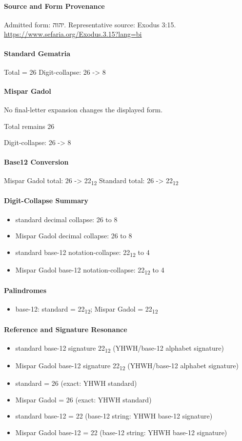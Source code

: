 \paragraph{Source and Form Provenance}
Admitted form: יהוה.
Representative source: Exodus 3:15.
\url{https://www.sefaria.org/Exodus.3.15?lang=bi}
\paragraph{Standard Gematria}
Total = 26
Digit-collapse: 26 -> 8
\paragraph{Mispar Gadol}
No final-letter expansion changes the displayed form.

Total remains 26

Digit-collapse: 26 -> 8
\paragraph{Base12 Conversion}
Mispar Gadol total: 26 -> 22\textsubscript{12}
Standard total: 26 -> 22\textsubscript{12}
\paragraph{Digit-Collapse Summary}
\begin{itemize}
\item standard decimal collapse: 26 to 8
\item Mispar Gadol decimal collapse: 26 to 8
\item standard base-12 notation-collapse: 22\textsubscript{12} to 4
\item Mispar Gadol base-12 notation-collapse: 22\textsubscript{12} to 4
\end{itemize}
\paragraph{Palindromes}
\begin{itemize}
\item base-12: standard = 22\textsubscript{12}; Mispar Gadol = 22\textsubscript{12}
\end{itemize}
\paragraph{Reference and Signature Resonance}
\begin{itemize}
\item standard base-12 signature 22\textsubscript{12} (YHWH/base-12 alphabet signature)
\item Mispar Gadol base-12 signature 22\textsubscript{12} (YHWH/base-12 alphabet signature)
\item standard = 26 (exact: YHWH standard)
\item Mispar Gadol = 26 (exact: YHWH standard)
\item standard base-12 = 22 (base-12 string: YHWH base-12 signature)
\item Mispar Gadol base-12 = 22 (base-12 string: YHWH base-12 signature)
\end{itemize}

